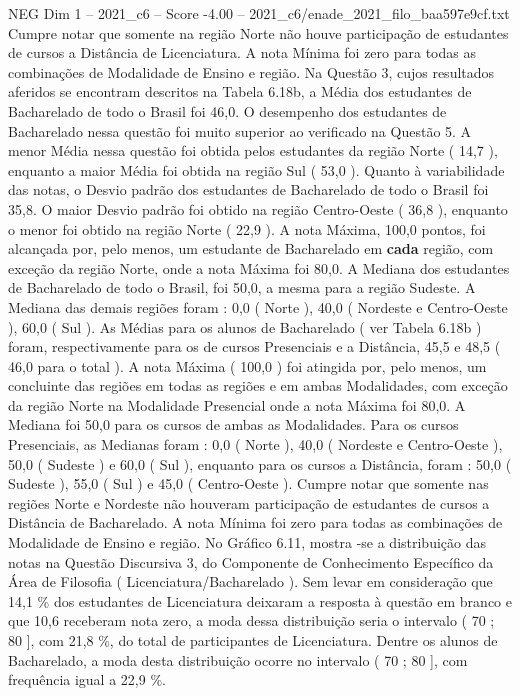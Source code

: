 \begin{textsample}{NEG Dim 1 – 2021\_c6 – Score -4.00 – 2021\_c6/enade\_2021\_filo\_baa597e9cf.txt}
Cumpre notar que somente na região Norte não houve participação de estudantes de cursos a Distância de Licenciatura.
A nota Mínima foi zero para todas as combinações de Modalidade de Ensino e região.
Na Questão 3, cujos resultados aferidos se encontram descritos na Tabela 6.18b, a Média dos estudantes de Bacharelado de todo o Brasil foi 46,0.
O desempenho dos estudantes de Bacharelado nessa questão foi muito superior ao verificado na Questão 5.
A menor Média nessa questão foi obtida pelos estudantes da região Norte ( 14,7 ), enquanto a maior Média foi obtida na região Sul ( 53,0 ).
Quanto à variabilidade das notas, o Desvio padrão dos estudantes de Bacharelado de todo o Brasil foi 35,8.
O maior Desvio padrão foi obtido na região Centro-Oeste ( 36,8 ), enquanto o menor foi obtido na região Norte ( 22,9 ).
A nota Máxima, 100,0 pontos, foi alcançada por, pelo menos, um estudante de Bacharelado em \textbf{cada} região, com exceção da região Norte, onde a nota Máxima foi 80,0.
A Mediana dos estudantes de Bacharelado de todo o Brasil, foi 50,0, a mesma para a região Sudeste.
A Mediana das demais regiões foram : 0,0 ( Norte ), 40,0 ( Nordeste e Centro-Oeste ), 60,0 ( Sul ).
As Médias para os alunos de Bacharelado ( ver Tabela 6.18b ) foram, respectivamente para os de cursos Presenciais e a Distância, 45,5 e 48,5 ( 46,0 para o total ).
A nota Máxima ( 100,0 ) foi atingida por, pelo menos, um concluinte das regiões em todas as regiões e em ambas Modalidades, com exceção da região Norte na Modalidade Presencial onde a nota Máxima foi 80,0.
A Mediana foi 50,0 para os cursos de ambas as Modalidades.
Para os cursos Presenciais, as Medianas foram : 0,0 ( Norte ), 40,0 ( Nordeste e Centro-Oeste ), 50,0 ( Sudeste ) e 60,0 ( Sul ), enquanto para os cursos a Distância, foram : 50,0 ( Sudeste ), 55,0 ( Sul ) e 45,0 ( Centro-Oeste ).
Cumpre notar que somente nas regiões Norte e Nordeste não houveram participação de estudantes de cursos a Distância de Bacharelado.
A nota Mínima foi zero para todas as combinações de Modalidade de Ensino e região.
No Gráfico 6.11, mostra -se a distribuição das notas na Questão Discursiva 3, do Componente de Conhecimento Específico da Área de Filosofia ( Licenciatura/Bacharelado ).
Sem levar em consideração que 14,1 \% dos estudantes de Licenciatura deixaram a resposta à questão em branco e que 10,6 receberam nota zero, a moda dessa distribuição seria o intervalo ( 70 ; 80 ], com 21,8 \%, do total de participantes de Licenciatura.
Dentre os alunos de Bacharelado, a moda desta distribuição ocorre no intervalo ( 70 ; 80 ], com frequência igual a 22,9 \%.

\end{textsample}
